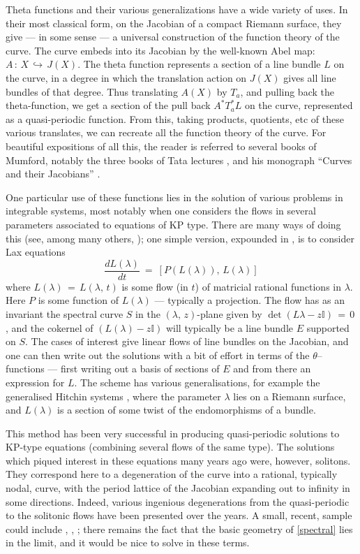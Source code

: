 \documentclass[12pt,reqno]{amsart}
\numberwithin{equation}{section}
\theoremstyle{definition}
\theoremstyle{remark}
\def\bI{{\mathbb {I}}}
\begin{document}
Theta functions and their various generalizations have a wide variety of uses. In their most classical 
form, on the Jacobian of a compact Riemann surface, they give --- in some sense --- a universal construction
of the function theory of the curve. The curve embeds into its Jacobian by the well-known
Abel map: $A\, :\, X\,\hookrightarrow\, J(X)$. The theta function represents a section of a line bundle $L$ on the curve, in a 
degree in which the translation action on $J(X)$ gives all line bundles of that degree. Thus translating $A(X)$ by $T_a$, and pulling back the 
theta-function, we get a section of the pull back $A^* T_a^* L$ on the curve, represented as a quasi-periodic function. From this, taking products, 
quotients, etc of these various translates, we can recreate all the function theory of the curve.
For beautiful expositions of all this, 
the reader is referred to several books of Mumford, notably the three books of Tata lectures \cite{Mu1, 
Mu2, Mu3}, and his monograph ``Curves and their Jacobians'' \cite{Mu4}.

One particular use of these functions lies in the solution of various problems in integrable systems, most 
notably when one considers the flows in several parameters associated to equations of KP type. There are many 
ways of doing this (see, among many others, \cite{B, K, Du}); one simple version, expounded in \cite{AHH}, is 
to consider Lax equations
\begin{equation}\label{spectral}
\frac{ dL(\lambda) }{dt}\ =\ [P(L(\lambda)),\, L(\lambda)]\end{equation}
where $L(\lambda)\, =\, L(\lambda,\, t)$ is some flow (in $t$) of matricial rational functions in $\lambda$. Here $P$ is
some function of $L(\lambda)$ --- typically a projection. The flow has as an invariant the spectral curve $S$ in
the $(\lambda,\, z)$-plane given by $\det(L\lambda - z\bI) \,=\, 0$, and the cokernel of $(L(\lambda) - z\bI)$ will typically be a line bundle $E$ supported on $S$. The cases of interest   give   linear flows of line bundles on the Jacobian, and one can then write out the solutions with a bit of
effort in terms of the $\theta$--functions --- first writing out a basis of sections of $E$ and from there an expression for $L$. The scheme has various generalisations, for example the  generalised Hitchin systems \cite{BR, Bo, Ma}, where the parameter $\lambda$ lies on a Riemann surface, and $L(\lambda)$ is a section of some twist of the endomorphisms of a bundle.

This method has been very successful in producing quasi-periodic solutions to KP-type equations (combining several flows of the same type). The 
solutions which piqued interest in these equations many years ago were, however, solitons.  They 
correspond here to a degeneration of the curve into a rational, typically nodal, curve, with the period 
lattice of the Jacobian expanding out to infinity in some directions. Indeed, various ingenious 
degenerations from the quasi-periodic to the solitonic flows have been presented over the years.
A small, recent, sample could include \cite{Ab},
\cite{Ga}, \cite{Ko}; there remains the fact that the basic geometry of \eqref{spectral} lies in the limit, and it would 
be nice to solve in these terms.
\end{document}
